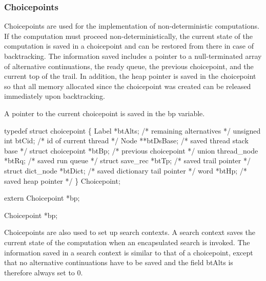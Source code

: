 \nwendcode{}\nwdocspar
\subsubsection{Choicepoints}
Choicepoints are used for the implementation of non-deterministic
computations. If the computation must proceed non-deterministically,
the current state of the computation is saved in a choicepoint and can
be restored from there in case of backtracking. The information saved
includes a pointer to a null-terminated array of alternative
continuations, the ready queue, the previous choicepoint, and the
current top of the trail. In addition, the heap pointer is saved in
the choicepoint so that all memory allocated since the choicepoint was
created can be released immediately upon backtracking.

A pointer to the current choicepoint is saved in the {\Tt{}bp\nwendquote}
variable.

\nwenddocs{}\plusendmoddef\nwstartdeflinemarkup{}\nwenddeflinemarkup
typedef struct choicepoint \{
    Label              *btAlts;         /* remaining alternatives */
    unsigned int       btCid;           /* id of current thread */
    Node               **btDsBase;      /* saved thread stack base */
    struct choicepoint *btBp;           /* previous choicepoint */
    union thread_node  *btRq;           /* saved run queue */
    struct save_rec    *btTp;           /* saved trail pointer */
    struct dict_node   *btDict;         /* saved dictionary tail pointer */
    word               *btHp;           /* saved heap pointer */
\} Choicepoint;

extern Choicepoint *bp;

\nwendcode{}\nwdocspar
\nwenddocs{}\plusendmoddef\nwstartdeflinemarkup{}\nwenddeflinemarkup
Choicepoint *bp;

\nwendcode{}\nwdocspar
Choicepoints are also used to set up search contexts. A search context
saves the current state of the computation when an encapsulated search
is invoked. The information saved in a search context is similar to
that of a choicepoint, except that no alternative continuations have
to be saved and the field {\Tt{}btAlts\nwendquote} is therefore always set to
{\Tt{}0\nwendquote}.

